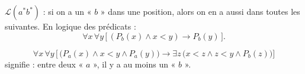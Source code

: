 \begin{exemple}
$\mathcal{L}(a^*b^*)$ : si on a un « $b$ » dans une position, alors on en a aussi dans toutes les suivantes.
En logique des prédicats :
\[
\forall x\, \forall y\, \big[\, (P_b(x) \wedge x < y) \rightarrow P_b(y) \,\big].
\]
\end{exemple}

\begin{exemple}
\[
\forall x\, \forall y\, \Big[\, \big(P_a(x) \wedge x < y \wedge P_a(y)\big) \rightarrow \exists z\, \big(x < z \wedge z < y \wedge P_b(z)\big) \Big]
\]
signifie : entre deux « $a$ », il y a au moins un « $b$ ».
\end{exemple}
